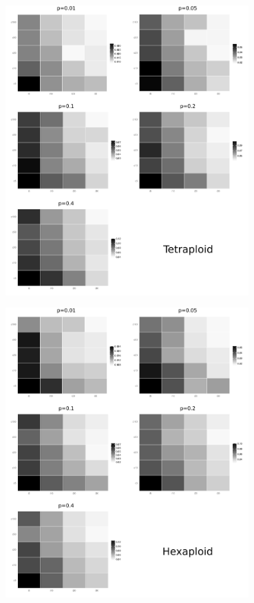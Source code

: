 \documentclass[presentation]{beamer}
\begin{document}
\begin{frame}[c,plain]{}
	\begin{center}
		\includegraphics[width=0.7\textwidth]{fig/figure2-tetra-heatmaps}
	\end{center}
\end{frame}

\begin{frame}[c,plain]{}
	\begin{center}
		\includegraphics[width=0.7\textwidth]{fig/figure3-hex-heatmaps}
	\end{center}
\end{frame}
\end{document}
